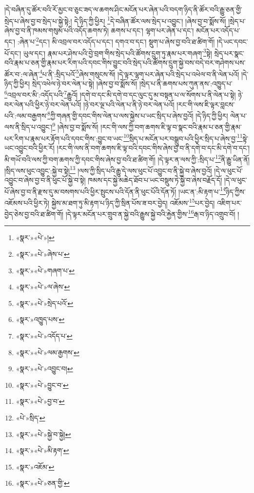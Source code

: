 །དེ་བཞིན་དུ་ཚོར་བའི་རོ་མྱང་བ་ཅུང་ཟད་ལ་ཆགས་ཤིང་མངོན་པར་ཞེན་པའི་བདག་ཉིད་ནི་ཚོར་བའི་རྒྱུ་ཅན་གྱི་སྲེད་པ་ཞེས་བྱ་བ་སྲེད་པ་སྐྱེ་སྟེ:། དེ་ཉིད་ཀྱི་ཕྱིར། \footnote{«སྣར་»«པེ་»།  }དེ་བཞིན་ཚོར་ལས་སྲེད་པ་འབྱུང་། །ཞེས་བྱ་བ་སྨོས་སོ། །སྲེད་པ་ཞེས་བྱ་བ་ནི་ཁམས་གསུམ་པའི་འདོད་ཆགས་ཏེ། ཆགས་པ་དང་། ལྷག་པར་ཞེན་པ་དང་། མངོན་པར་འདོད་པ་དང་། :ཞེན་པ་\footnote{«སྣར་»«པེ་»ཞེས་པ་}དང་། མི་འབྲལ་བར་འདོད་པ་དང་། དགའ་བ་དང་། སྡུག་པ་ཞེས་བྱ་བའི་ཐ་ཚིག་གོ། །དེ་ཡང་དབང་པོ་དང་། ཡུལ་དང་། རྣམ་པར་ཤེས་པའི་བྱེ་བྲག་གིས་སྲེད་པའི་ཚོགས་དྲུག་ཏུ་རྣམ་པར་གཞག་\footnote{«སྣར་»«པེ་»གཞག་པ་}སྟེ། སྲེད་པར་སྣང་བའི་རྣམ་པ་ཅན་གྱི་རྣམ་པར་རིག་པའི་དབང་གིས་བྱུང་བའི་སྲེད་པའི་ཚོགས་དྲུག་སྐྱེ་བས་བདེ་བར་གཤེགས་པས་ཚོར་བ་:ལ་ཞེན་\footnote{«སྣར་»«པེ་»ལ་ཞེས་}པ་ནི་:སྲིད་པའོ་\footnote{«སྣར་»«པེ་»སྲེད་པའོ་}ཞེས་གསུངས་སོ། །དེ་ལྟར་ལྷག་པར་ཞེན་པའི་སྲེད་པ་འཕེལ་བ་ནི་ལེན་པའོ། །དེ་ཉིད་ཀྱི་ཕྱིར། སྲེད་འཕེལ་ཉེ་བར་ལེན་པ་སྟེ། །ཞེས་བྱ་བ་སྨོས་སོ། །སྲེད་པ་ནི་ཆགས་པས་ཀུན་ནས་:འཁྱུད་པ་\footnote{«སྣར་»འཁྱུད་པས་}འབྲལ་བར་མི་:འདོད་པའི་\footnote{«སྣར་»«པེ་»འདོད་པ་}རྒྱུའོ། །དགེ་བ་དང་མི་དགེ་བ་དང་ལུང་དུ་མ་བསྟན་པ་ལ་སོགས་པ་ནི་ལེན་པ་སྟེ། ཉེ་བར་ལེན་པའི་ཕྱིར་ཉེ་བར་ལེན་པའོ། །ཉེ་བར་ལྔ་པའི་ལེན་པ་ནི་ཉེ་བར་ལེན་པའོ། །རང་གི་ལས་ཇི་ལྟར་བླངས་པའི་:ལམ་བརྒྱགས་\footnote{«སྣར་»«པེ་»ལམ་རྒྱགས་}ཀྱི་གཞན་གྱི་དབང་གིས་ལེན་པ་ལས་སྐྱེས་པ་ཡང་སྲིད་པ་ཞེས་བྱའོ། །དེ་ཉིད་ཀྱི་ཕྱིར། ལེན་པ་ལས་ནི་སྲིད་པ་འབྱུང་།\footnote{«སྣར་»«པེ་»འབྱུང་བ།} །ཞེས་བྱ་བ་སྨོས་སོ། །རང་གི་ལས་ཀྱི་བག་ཆགས་ཇི་ལྟ་བ་སྣང་བའི་རྣམ་པ་ཅན་གྱི་རྣམ་པར་རིག་པ་རྣམ་པར་རྟོག་པའི་དབང་གིས་:བྱུང་བ་ཡང་\footnote{«སྣར་»«པེ་»བྱུང་བ་}སྲིད་པ་མངོན་པར་བསྒྲུབ་པའི་ཕྱིར་སྲིད་པ་ཞེས་བྱ་\footnote{«སྣར་»«པེ་»བྱ་བ་}སྟེ་ཡང་འབྱུང་བའི་ཕྱིར་རོ། །རང་གི་ལས་ནི་བག་ཆགས་ཇི་ལྟ་བའི་དབང་གིས་ཞེས་བྱ་བ་ནི་དགེ་བ་དང་མི་དགེ་བ་དང་། མི་གཡོ་བའི་ལས་ཀྱི་བག་ཆགས་ཀྱི་དབང་གིས་ཞེས་བྱ་བའི་ཐ་ཚིག་གོ། །དེ་ལྟར་ན་ལས་ཀྱི་:སྲིད་པ་\footnote{«པེ་»སྲིད་}ནི་རྒྱུ་ཡིན་ནོ། །སྲིད་ལས་ཕུང་འབྱུང་:སྐྱེ་བ་སྟེ།\footnote{«སྣར་»«པེ་»སྐྱེ་བ་སྐྱེ།} །ལས་ཀྱི་སྲིད་པའི་རྒྱུ་དེ་ལས་ཕུང་པོ་འབྱུང་བ་ནི་སྐྱེ་བ་ཞེས་བྱའོ། །དེ་ལ་ཕུང་པོ་འབྱུང་བ་ཞེས་བྱ་བ་ནི་ཕུང་པོ་སྐྱེ་བ་སྟེ། ཁམས་དང་སྐྱེ་མཆེད་ཐོབ་པ་ཡང་བསྡུས་ཏེ་སྐྱེ་བ་ཞེས་བརྗོད་དོ། །དེ་ལ་ཕུང་པོ་ཞེས་བྱ་བ་ནི་རྫས་དུ་མ་བསགས་པའི་ཕྱིར་སྤུངས་པའི་དོན་ནི་ཕུང་པོའི་དོན་ཏོ། །ཡང་ན་:མི་རྟག་པ་\footnote{«སྣར་»«པེ་»མི་རྟག་}ཉིད་ཀྱིས་འཇོམས་པའི་ཕྱིར་ཏེ། སྐྱེས་མ་ཐག་ཏུ་མི་རྟག་པ་ཉིད་ཀྱི་སྲིན་པོས་ཟ་བར་བྱེད། འཇོམས་\footnote{«སྣར་»འཇོམ་}པར་བྱེད། འཇིག་པར་བྱེད་ཅེས་བྱ་བའི་ཐ་ཚིག་གོ། །དེ་ལྟར་མངོན་པར་གྲུབ་ན་སྐྱེ་བའི་རྒྱུས་སྐྱེ་བའི་རྐྱེན་གྱིས་\footnote{«སྣར་»«པེ་»ཅན་གྱི་}རྒ་བ་ཉིད་འགྲུབ་བོ། །
